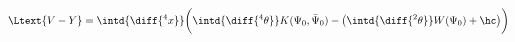 \begin{equation}
  \label{eq:VYintro}
  \Ltext{V-Y} = \intd{\diff{^4x}} \biggl( \intd{\diff{^4 \theta}} K(\Psi_0,
  \bar{\Psi}_0) - \bigl(\intd{\diff{^2 \theta}} W(\Psi_0) + \hc \bigr) \biggr)
\end{equation}

